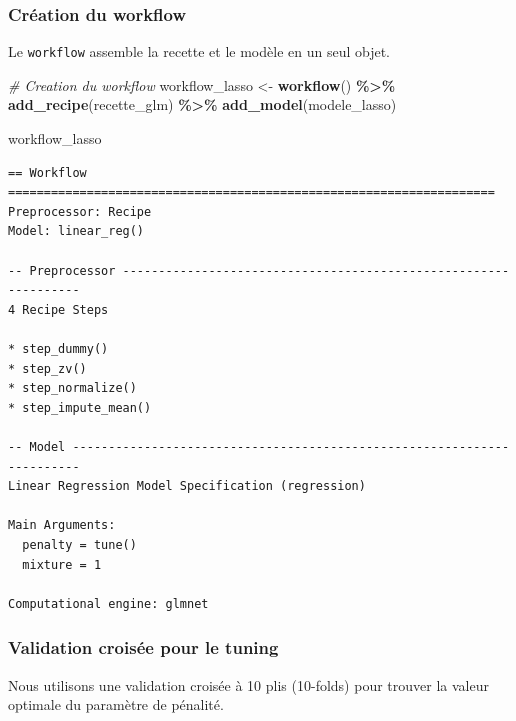\documentclass[
  french,
]{book}
\newenvironment{Shaded}{\begin{snugshade}}{\end{snugshade}}
\newcommand{\CommentTok}[1]{\textcolor[rgb]{0.56,0.35,0.01}{\textit{#1}}}
\newcommand{\FunctionTok}[1]{\textcolor[rgb]{0.13,0.29,0.53}{\textbf{#1}}}
\newcommand{\NormalTok}[1]{#1}
\newcommand{\OtherTok}[1]{\textcolor[rgb]{0.56,0.35,0.01}{#1}}
\newcommand{\SpecialCharTok}[1]{\textcolor[rgb]{0.81,0.36,0.00}{\textbf{#1}}}
\theoremstyle{definition}
\theoremstyle{definition}
\theoremstyle{definition}
\theoremstyle{definition}
\theoremstyle{remark}
\begin{document}
\subsubsection*{Création du workflow}

Le \texttt{workflow} assemble la recette et le modèle en un seul objet.

\begin{Shaded}
\begin{Highlighting}[]
\CommentTok{\# Creation du workflow}
\NormalTok{workflow\_lasso }\OtherTok{\textless{}{-}} \FunctionTok{workflow}\NormalTok{() }\SpecialCharTok{\%\textgreater{}\%}
  \FunctionTok{add\_recipe}\NormalTok{(recette\_glm) }\SpecialCharTok{\%\textgreater{}\%}
  \FunctionTok{add\_model}\NormalTok{(modele\_lasso)}

\NormalTok{workflow\_lasso}
\end{Highlighting}
\end{Shaded}

\begin{verbatim}
== Workflow ====================================================================
Preprocessor: Recipe
Model: linear_reg()

-- Preprocessor ----------------------------------------------------------------
4 Recipe Steps

* step_dummy()
* step_zv()
* step_normalize()
* step_impute_mean()

-- Model -----------------------------------------------------------------------
Linear Regression Model Specification (regression)

Main Arguments:
  penalty = tune()
  mixture = 1

Computational engine: glmnet 
\end{verbatim}

\subsubsection*{Validation croisée pour le tuning}

Nous utilisons une validation croisée à 10 plis (10-folds) pour trouver la valeur optimale du paramètre de pénalité.
\end{document}
